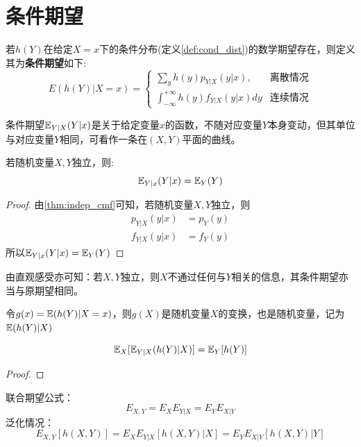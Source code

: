 \section{条件期望}

\begin{definition}
    若$h(Y)$在给定$X=x$下的条件分布(定义\ref{def:cond_dist})的数学期望存在，则定义其为\textbf{条件期望}如下:
    \[ E(h(Y)|X=x) =\begin{cases}
            \sum_{y} h(y) p_{Y|X}(y|x),                    & \text{离散情况} \\
            \int_{-\infty}^{+\infty} h(y) f_{Y|X}(y|x) d y & \text{连续情况}
        \end{cases}\]
\end{definition}

\begin{remark}
    条件期望$\mathbb{E}_{Y|X}(Y|x)$是关于给定变量$x$的函数，不随对应变量$Y$本身变动，但其单位与对应变量$Y$相同，可看作一条在$(X,Y)$平面的曲线。
\end{remark}

\begin{theorem}
    若随机变量$X,Y$独立，则:
    \[ \mathbb{E}_{Y|x}(Y|x)=\mathbb{E}_{Y}(Y) \]
\end{theorem}

\begin{proof}
    由\ref{thm:indep_cmf}可知，若随机变量$X,Y$独立，则
    \begin{align*}
        p_{Y|X}(y|x) & =p_{Y}(y) \\
        f_{Y|X}(y|x) & =f_{Y}(y)
    \end{align*}
    所以$\mathbb{E}_{Y|x}(Y|x)=\mathbb{E}_{Y}(Y)$
\end{proof}

由直观感受亦可知：若$X,Y$独立，则$X$不通过任何与$Y$相关的信息，其条件期望亦当与原期望相同。

\begin{note}
    令$g(x)=\mathbb{E}(h(Y)|X=x)$，则$g(X)$是随机变量$X$的变换，也是随机变量，记为$\mathbb{E}(h(Y)|X)$
\end{note}

\begin{theorem}[重期望公式]
    \[ \mathbb{E}_X[\mathbb{E}_{Y|X}(h(Y)|X)] = \mathbb{E}_{Y}[h(Y)] \]
\end{theorem}

\begin{proof}
\end{proof}

\begin{theorem}
    联合期望公式：
    \[ E_{X,Y}=E_X E_{Y|X} = E_Y E_{X|Y} \]
    泛化情况：
    \[ E_{X,Y}[h(X,Y)]=E_X E_{Y|X}[h(X,Y)|X] = E_Y E_{X|Y}[h(X,Y)|Y] \]
\end{theorem}

